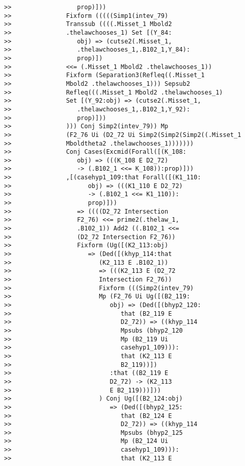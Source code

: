 \documentclass[12pt]{article}
\begin{document}
\begin{verbatim}
>>                  prop)]))
>>               Fixform (((((Simp1(intev_79)
>>               Transsub ((((.Misset_1 Mbold2
>>               .thelawchooses_1) Set [(Y_84:
>>                  obj) => (cutse2(.Misset_1,
>>                  .thelawchooses_1,.B102_1,Y_84):
>>                  prop)])
>>               <<= (.Misset_1 Mbold2 .thelawchooses_1))
>>               Fixform (Separation3(Refleq((.Misset_1
>>               Mbold2 .thelawchooses_1))) Sepsub2
>>               Refleq(((.Misset_1 Mbold2 .thelawchooses_1)
>>               Set [(Y_92:obj) => (cutse2(.Misset_1,
>>                  .thelawchooses_1,.B102_1,Y_92):
>>                  prop)]))
>>               ))) Conj Simp2(intev_79)) Mp
>>               (F2_76 Ui (D2_72 Ui Simp2(Simp2(Simp2((.Misset_1
>>               Mboldtheta2 .thelawchooses_1)))))))
>>               Conj Cases(Excmid(Forall([(K_108:
>>                  obj) => (((K_108 E D2_72)
>>                  -> (.B102_1 <<= K_108)):prop)]))
>>               ,[(casehyp1_109:that Forall([(K1_110:
>>                     obj) => (((K1_110 E D2_72)
>>                     -> (.B102_1 <<= K1_110)):
>>                     prop)]))
>>                  => ((((D2_72 Intersection
>>                  F2_76) <<= prime2(.thelaw_1,
>>                  .B102_1)) Add2 ((.B102_1 <<=
>>                  (D2_72 Intersection F2_76))
>>                  Fixform (Ug([(K2_113:obj)
>>                     => (Ded([(khyp_114:that
>>                        (K2_113 E .B102_1))
>>                        => (((K2_113 E (D2_72
>>                        Intersection F2_76))
>>                        Fixform (((Simp2(intev_79)
>>                        Mp (F2_76 Ui Ug([(B2_119:
>>                           obj) => (Ded([(bhyp2_120:
>>                              that (B2_119 E
>>                              D2_72)) => ((khyp_114
>>                              Mpsubs (bhyp2_120
>>                              Mp (B2_119 Ui
>>                              casehyp1_109))):
>>                              that (K2_113 E
>>                              B2_119))])
>>                           :that ((B2_119 E
>>                           D2_72) -> (K2_113
>>                           E B2_119)))]))
>>                        ) Conj Ug([(B2_124:obj)
>>                           => (Ded([(bhyp2_125:
>>                              that (B2_124 E
>>                              D2_72)) => ((khyp_114
>>                              Mpsubs (bhyp2_125
>>                              Mp (B2_124 Ui
>>                              casehyp1_109))):
>>                              that (K2_113 E

\end{verbatim}
\end{document}
